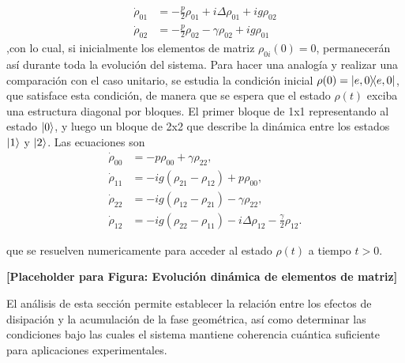 \begin{equation}
    \begin{aligned}
        \dot \rho_{01} & =-\frac{p}{2} \rho_{01}+i\Delta\rho_{01}+ig\rho_{02} \\
        \dot \rho_{02} & =-\frac{p}{2} \rho_{02}-\gamma \rho_{02}+ig\rho_{01}
    \end{aligned}
\end{equation}
,con lo cual, si inicialmente los elementos de matriz $\rho_{0i}(0)=0$, permanecerán así durante toda la evolución del sistema. Para hacer una analogía y realizar una comparación con el caso unitario, se estudia la condición inicial $\rho(0)=\ketbra{e,0}{e,0}$, que satisface esta condición, de manera que se espera que el estado $\rho(t)$ exciba una estructura diagonal por bloques. El primer bloque de 1x1 representando al estado $\ket{0}$, y luego un bloque de 2x2 que describe la dinámica entre los estados $\ket{1}$ y $\ket{2}$. Las ecuaciones son
\begin{equation}
\begin{aligned}
\dot{\rho}_{00} &= -p \rho_{00} + \gamma \rho_{22}, \\
\dot{\rho}_{11} &= -i g (\rho_{21} - \rho_{12}) + p \rho_{00}, \\
\dot{\rho}_{22} &= -i g (\rho_{12} - \rho_{21}) - \gamma \rho_{22}, \\
\dot{\rho}_{12} &= -i g (\rho_{22} - \rho_{11}) - i \Delta \rho_{12} - \frac{\gamma}{2} \rho_{12}.
\end{aligned}
\end{equation}

que se resuelven numericamente para acceder al estado $\rho(t)$ a tiempo $t>0$. 

\textbf{[Placeholder para Figura: Evolución dinámica de elementos de matriz]}

El análisis de esta sección permite establecer la relación entre los efectos de disipación y la acumulación de la fase geométrica, así como determinar las condiciones bajo las cuales el sistema mantiene coherencia cuántica suficiente para aplicaciones experimentales.
